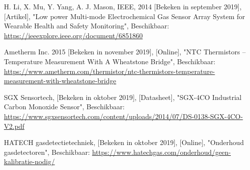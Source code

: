 \documentclass[a4paper, 11pt]{article} %
\begin{document}
\begin{thebibliography}{9}
		\newpage
		H. Li, X. Mu, Y. Yang, A. J. Mason,
		IEEE,
		2014 [Bekeken in september 2019],
		[Artikel],
		"Low power Multi-mode Electrochemical Gas
		Sensor Array System for Wearable Health and
		Safety Monitoring",
		Beschikbaar: \url{https://ieeexplore.ieee.org/document/6851860}
		
		Ametherm Inc.
		2015 [Bekeken in november 2019],
		[Online],
		"NTC Thermistors – Temperature Measurement With A Wheatstone Bridge",
		Beschikbaar: \url{https://www.ametherm.com/thermistor/ntc-thermistors-temperature-measurement-with-wheatstone-bridge}
		
		SGX Sensortech,
		[Bekeken in oktober 2019],
		[Datasheet],
		"SGX-4CO Industrial Carbon Monoxide Sensor",
		Beschikbaar: \url{https://www.sgxsensortech.com/content/uploads/2014/07/DS-0138-SGX-4CO-V2.pdf}

		HATECH gasdetectietechniek,
		[Bekeken in oktober 2019],
		[Online],
		"Onderhoud gasdetectoren",
		Beschikbaar: \url{https://www.hatechgas.com/onderhoud/geen-kalibratie-nodig/}	
		
	\end{thebibliography}
\end{document}
